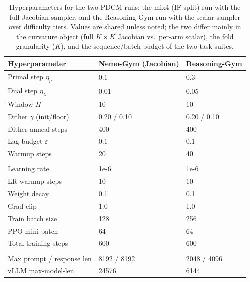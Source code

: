 \begin{table}[t]
\centering
\small
\caption{Hyperparameters for the two \textsc{PDCM} runs: the mix4 (IF-split) run with the full-Jacobian
sampler, and the Reasoning-Gym run with the scalar sampler over difficulty tiers. Values are shared
unless noted; the two differ mainly in the curvature object (full $K\times K$ Jacobian vs.\ per-arm scalar),
the fold granularity ($K$), and the sequence/batch budget of the two task suites.}
\label{tab:pdcm-hparams}
\begin{tabular}{l l l}
\toprule
Hyperparameter & Nemo-Gym (Jacobian) & Reasoning-Gym \\
\midrule
Primal step $\eta_p$      & 0.1               & 0.3 \\
Dual step $\eta_\lambda$        & 0.01              & 0.05 \\
Window $H$                & 10                & 10 \\
Dither $\gamma$ (init/floor) & 0.20 / 0.10    & 0.20 / 0.10 \\
Dither anneal steps       & 400               & 400 \\
Lag budget $\varepsilon$  & 0.1               & 0.1 \\
Warmup steps              & 20                & 40 \\
\addlinespace
\multicolumn{3}{l}{\emph{Optimization}} \\
Learning rate             & 1e-6              & 1e-6 \\
LR warmup steps           & 10                & 10 \\
Weight decay              & 0.1               & 0.1 \\
Grad clip                 & 1.0               & 1.0 \\
Train batch size          & 128               & 256 \\
PPO mini-batch            & 64                & 64 \\
Total training steps      & 600               & 600 \\
\addlinespace
\multicolumn{3}{l}{\emph{Sequence / rollout}} \\
Max prompt / response len & 8192 / 8192       & 2048 / 4096 \\
vLLM max-model-len        & 24576             & 6144 \\
\bottomrule
\end{tabular}
\end{table}
\newpage


